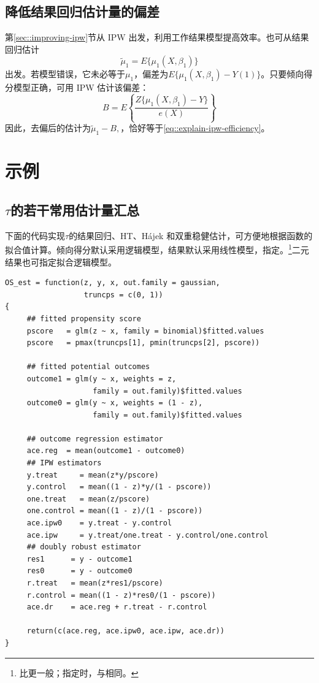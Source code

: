 \subsection{降低结果回归估计量的偏差}\label{sec::improving-outreg}


第\ref{sec::improving-ipw}节从 IPW 出发，利用工作结果模型提高效率。也可从结果回归估计
$$
\tilde{\mu}_1 = E\{\mu_1(X, \beta_1)\} 
$$
出发。若模型错误，它未必等于$\mu_1$，偏差为$ E\{\mu_1(X, \beta_1)  -  Y(1)\}   $。只要倾向得分模型正确，可用 IPW 估计该偏差：
$$
B = 
E\left\{ \frac{Z \{\mu_1(X, \beta_1) - Y\}}{e(X)} \right\} 
$$
因此，去偏后的估计为$
\tilde{\mu}_1 - B  ,
$，恰好等于\eqref{eq::explain-ipw-efficiency}。 


\section{示例}
\label{sec::dr-examples}


\subsection{$\tau$的若干常用估计量汇总}


下面的代码实现$\tau$的结果回归、HT、Hájek 和双重稳健估计，可方便地根据函数的拟合值计算。倾向得分默认采用逻辑模型，结果默认采用线性模型，指定。\footnote{比更一般；指定时，与相同。}二元结果也可指定拟合逻辑模型。

\begin{lstlisting}
OS_est = function(z, y, x, out.family = gaussian, 
                  truncps = c(0, 1))
{
     ## fitted propensity score
     pscore   = glm(z ~ x, family = binomial)$fitted.values
     pscore   = pmax(truncps[1], pmin(truncps[2], pscore))
     
     ## fitted potential outcomes
     outcome1 = glm(y ~ x, weights = z, 
                    family = out.family)$fitted.values
     outcome0 = glm(y ~ x, weights = (1 - z), 
                    family = out.family)$fitted.values
     
     ## outcome regression estimator
     ace.reg  = mean(outcome1 - outcome0) 
     ## IPW estimators
     y.treat     = mean(z*y/pscore)
     y.control   = mean((1 - z)*y/(1 - pscore))
     one.treat   = mean(z/pscore)
     one.control = mean((1 - z)/(1 - pscore))
     ace.ipw0    = y.treat - y.control
     ace.ipw     = y.treat/one.treat - y.control/one.control
     ## doubly robust estimator
     res1      = y - outcome1
     res0      = y - outcome0
     r.treat   = mean(z*res1/pscore)
     r.control = mean((1 - z)*res0/(1 - pscore))
     ace.dr    = ace.reg + r.treat - r.control

     return(c(ace.reg, ace.ipw0, ace.ipw, ace.dr))     
}
\end{lstlisting}


